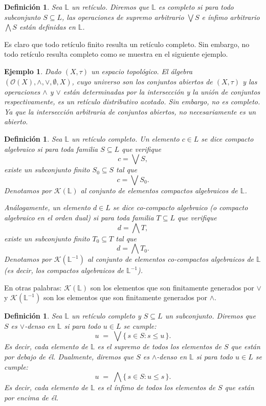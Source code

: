 \documentclass[12pt]{book}
\newtheorem{definition}[theorem]{Definición}
\newtheorem{example}{Ejemplo}
\begin{document}
\begin{definition} \label{reticulo completo} Sea $\mathbb{L}$ un retículo. Diremos que $\mathbb{L}$ es \emph{completo} si para todo subconjunto $S \subseteq L$, las operaciones de supremo arbitrario $\bigvee S$ e ínfimo arbitrario $\bigwedge S$ están definidas en $\mathbb{L}$.
\end{definition}

Es claro que todo retículo finito resulta un retículo completo. Sin embargo, no todo retículo resulta completo como se muestra en el siguiente ejemplo.

\begin{example} Dado $(X,\tau)$ un espacio topológico. El álgebra $\left( \mathcal{O}(X),\wedge,\vee,\emptyset,X \right)$, cuyo universo son los conjuntos abiertos de $(X,\tau)$ y las operaciones $\wedge$ y $\vee$ están determinadas por la intersección y la unión de conjuntos respectivamente, es un retículo distributivo acotado. Sin embargo, no es completo. Ya que la intersección arbitraria de conjuntos abiertos, no necesariamente es un abierto.
\end{example}

\begin{definition}\label{def:compactos-cocompactos}
Sea $\mathbb{L}$ un retículo completo. Un elemento $c \in L$ se dice \emph{compacto algebraico} si para toda familia $S \subseteq L$ que verifique 
\[
c = \bigvee S,
\]
existe un subconjunto finito $S_0 \subseteq S$ tal que
\[
c = \bigvee S_0.
\]
Denotamos por $\mathcal{K}(\mathbb{L})$ al conjunto de elementos compactos algebraicos de $\mathbb{L}$.

\noindent Análogamente, un elemento $d\in L$ se dice \emph{co-compacto algebraico} (o \emph{compacto algebraico en el orden dual}) si para toda familia $T\subseteq L$ que verifique
\[
d = \bigwedge T,
\]
existe un subconjunto finito $T_0\subseteq T$ tal que
\[
d = \bigwedge T_0.
\]
Denotamos por $\mathcal{K}(\mathbb{L}^{-1})$ al conjunto de elementos co-compactos algebraicos de $\mathbb{L}$ (es decir, los compactos algebraicos de $\mathbb{L}^{-1}$).
\end{definition}
En otras palabras: $\mathcal{K}(\mathbb L)$ son los elementos que son finitamente generados por \(\vee\) y
$\mathcal{K}(\mathbb L^{-1})$ son los elementos que son finitamente generados por \(\wedge\).\\

\begin{definition}\label{def:densidades-join-meet}
Sea $\mathbb{L}$ un retículo completo y $S\subseteq L$ un subconjunto.
Diremos que $S$ es \emph{$\vee$-denso} en $\mathbb{L}$ si para todo $u\in L$ se cumple:
\[
u \;=\; \bigvee\{\, s\in S : s\le u \,\}.
\]
Es decir, cada elemento de $\mathbb{L}$ es el supremo de todos los elementos de $S$ que están por debajo de él. Dualmente, diremos que $S$ es \emph{$\wedge$-denso} en $\mathbb{L}$ si para todo $u\in L$ se cumple:
    \[
    u \;=\; \bigwedge\{\, s\in S : u\le s \,\}.
    \]
    Es decir, cada elemento de $\mathbb{L}$ es el ínfimo de todos los elementos de $S$ que están por encima de él.
\end{definition}
\end{document}

